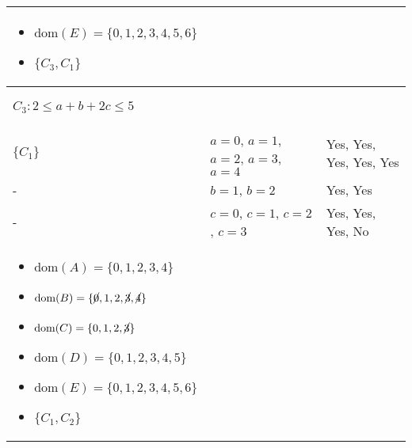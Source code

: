 \begin{example}
\begin{center}
\begin{tabular}{lll}
{\begin{itemize}
                \item $\text{dom}(E) = \{0, 1, 2, 3, 4, 5, 6\} $
                \item $\{C_3, C_1\}$
            \end{itemize}} \\
            \midrule
            \multicolumn{3}{p{\linewidth}}{
            \begin{center}
                $C_3: 2 \leq a + b + 2c \leq 5$
            \end{center}} \\
                $\{C_1\}$ & $a=0$, $a=1$, $a=2$, $a=3$, $a=4$ & Yes, Yes, Yes, Yes, Yes \\
                - & $b=1$, $b=2$ & Yes, Yes \\
                - & $c=0$, $c=1$, $c=2$, $c=3$ & Yes, Yes, Yes, No \\
            \multicolumn{3}{p{\linewidth}}{
            \begin{itemize}
                \item $\text{dom}(A) = \{0, 1, 2, 3, 4\}$
                \item $\text{dom}(B) = \{\cancel{0}, 1, 2, \cancel{3}, \cancel{4}\} $
                \item $\text{dom}(C) = \{0, 1, 2, \cancel{3}\} $
                \item $\text{dom}(D) = \{0, 1, 2, 3, 4, 5\} $
                \item $\text{dom}(E) = \{0, 1, 2, 3, 4, 5, 6\} $
                \item $\{C_1, C_2\}$
            \end{itemize}} \\
            \midrule
        \end{tabular}
    \end{center}
\end{example}
\newpage

